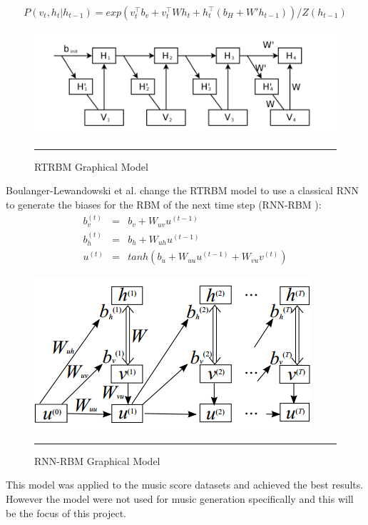 $$P(v_t, h_t| h_{t-1} ) = exp (v_t ^ \top b_v + v_t ^\top W h_t + h_t ^\top(b_H + W' h_{t-1})) / Z(h_{t - 1}) $$

\begin{figure}[htbp]
    \centering
    \includegraphics[scale=0.4]{Figures/RTRBM.png}
    \rule{35em}{0.5pt}
    \caption[RTRBM Graphical Model]{RTRBM Graphical Model}
    \label{fig:rtrbm}
\end{figure}

Boulanger-Lewandowski et al. change the RTRBM model to use a classical RNN to generate the biases for the RBM of the next time step (RNN-RBM \cite{boulanger2012modeling}): 
$$
\begin{array}{rcr}
    b_v^{(t)} & = & b_v + W_ {uv} u^{(t - 1)} \\
    b_h^{(t)} & = & b_h + W_{uh} u^{(t - 1)} \\
    u^{(t)} & = & tanh( b_u + W_{uu} u^{(t - 1)} + W_{vu}v^{(t)})
\end{array}
$$


\begin{figure}[htbp]
    \centering
    \includegraphics[scale=0.6]{Figures/RNNRBM.png}
    \rule{35em}{0.5pt}
    \caption[RNN-RBM Graphical Model]{RNN-RBM Graphical Model}
    \label{fig:rtrbm}
\end{figure}

This model was applied to the music score datasets and achieved the best results. However the model were not used for music generation specifically and this will be the focus of this project.

